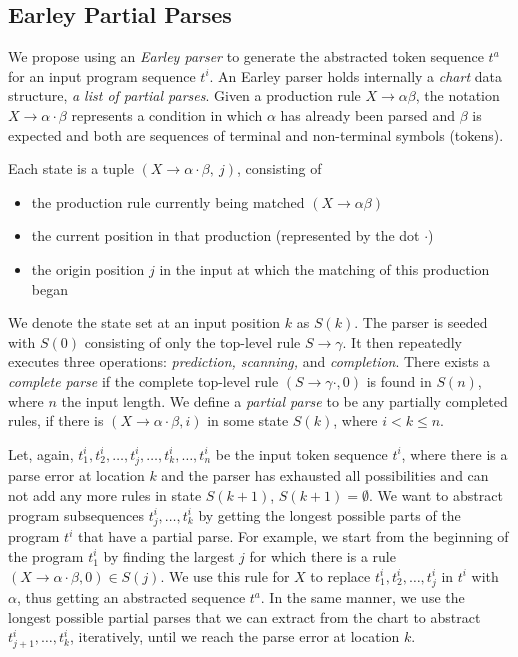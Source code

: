 \subsection{Earley Partial Parses}
\label{sec:prog-abstract:partial}

We propose using an \emph{Earley parser} to generate the abstracted token
sequence $t^a$ for an input program sequence $t^i$. An Earley parser holds
internally a \emph{chart} data structure, \ie \emph{a list of partial parses}.
Given a production rule $X \rightarrow \alpha \beta$, the notation $X
\rightarrow \alpha \cdot \beta$ represents a condition in which $\alpha$ has
already been parsed and $\beta$ is expected and both are sequences of terminal
and non-terminal symbols (tokens).

Each state is a tuple $(X \rightarrow \alpha \cdot \beta,\ j)$, consisting of
\begin{itemize}
    \item the production rule currently being matched $(X \rightarrow \alpha
    \beta)$
    \item the current position in that production (represented by the dot
    $\cdot$)
    \item the origin position $j$ in the input at which the matching of this
    production began
\end{itemize}

We denote the state set at an input position $k$ as $S(k)$. The parser is seeded
with $S(0)$ consisting of only the top-level rule $S \rightarrow \gamma$. It
then repeatedly executes three operations: \emph{prediction, scanning,} and
\emph{completion}. There exists a \emph{complete parse} if the complete
top-level rule $(S \rightarrow \gamma \cdot, 0)$ is found in $S(n)$, where $n$
the input length. We define a \emph{partial parse} to be any partially completed
rules, \ie if there is $(X \rightarrow \alpha \cdot \beta, i)$ in some state
$S(k)$, where $i < k \leq n$.


Let, again, $t^i_1, t^i_2, \dots, t^i_j, \dots, t^i_k, \dots, t^i_n$ be the
input token sequence $t^i$, where there is a parse error at location $k$ and the
parser has exhausted all possibilities and can not add any more rules in state
$S(k + 1)$, \ie $S(k + 1) = \emptyset$. We want to abstract program subsequences
$t^i_j, \dots, t^i_k$ by getting the longest possible parts of the program $t^i$
that have a partial parse. For example, we start from the beginning of the
program $t^i_1$ by finding the largest $j$ for which there is a rule $(X
\rightarrow \alpha \cdot \beta, 0) \in S(j)$. We use this rule for $X$ to
replace $t^i_1, t^i_2, \dots, t^i_j$ in $t^i$ with $\alpha$, thus getting an
abstracted sequence $t^a$. In the same manner, we use the longest possible
partial parses that we can extract from the chart to abstract $t^i_{j+1}, \dots,
t^i_k$, iteratively, until we reach the parse error at location $k$.

